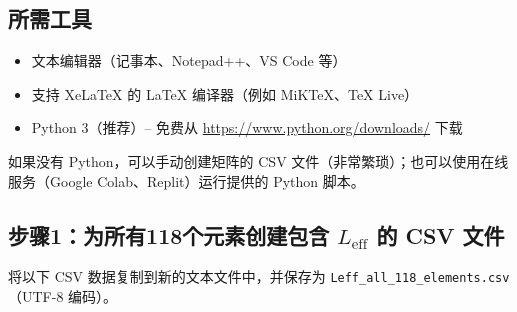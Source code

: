 \documentclass[11pt,a4paper]{article}
\begin{document}
	\subsection*{所需工具}
	\begin{itemize}
		\item 文本编辑器（记事本、Notepad++、VS Code 等）
		\item 支持 XeLaTeX 的 LaTeX 编译器（例如 MiKTeX、TeX Live）
		\item Python 3（推荐）– 免费从 \url{https://www.python.org/downloads/} 下载
	\end{itemize}
	如果没有 Python，可以手动创建矩阵的 CSV 文件（非常繁琐）；也可以使用在线服务（Google Colab、Replit）运行提供的 Python 脚本。
	
	\subsection*{步骤1：为所有118个元素创建包含 \(L_{\mathrm{eff}}\) 的 CSV 文件}
	将以下 CSV 数据复制到新的文本文件中，并保存为 \texttt{Leff\_all\_118\_elements.csv}（UTF-8 编码）。
	
\end{document}
